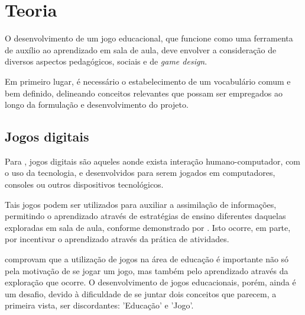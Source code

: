 
\chapter{Teoria}\label{cap-teoria}

O desenvolvimento de um jogo educacional, que funcione como uma ferramenta de auxílio ao
aprendizado em sala de aula, deve envolver a consideração de diversos aspectos
pedagógicos, sociais e de \textit{game design}.

Em primeiro lugar, é necessário o estabelecimento de um vocabulário comum e bem
definido, delineando conceitos relevantes que possam ser empregados ao longo da 
formulação e desenvolvimento do projeto.

\section{Jogos digitais}\label{sec-jogosdigitais}


Para \cite{correia:2009:digital_games_spore}, jogos digitais são aqueles aonde exista
interação humano-computador, com o uso da tecnologia, e desenvolvidos para serem 
jogados em computadores, consoles ou outros dispositivos tecnológicos.

Tais jogos podem ser utilizados para auxiliar a assimilação de informações, permitindo
o aprendizado através de estratégias de ensino diferentes daquelas exploradas em sala
de aula, conforme demonstrado por \cite{fernandes:2012:digital_education}. Isto 
ocorre, em parte, por incentivar o aprendizado através da prática de atividades.

\cite{correia:2009:digital_games_spore} comprovam que a utilização de jogos 
na área de educação é importante não só pela motivação de se jogar um jogo, 
mas também pelo aprendizado através da exploração que ocorre. O 
desenvolvimento de jogos educacionais, porém, ainda é um desafio, devido 
à dificuldade de se juntar dois conceitos que parecem, a primeira vista,
ser discordantes: 'Educação' e 'Jogo'.

